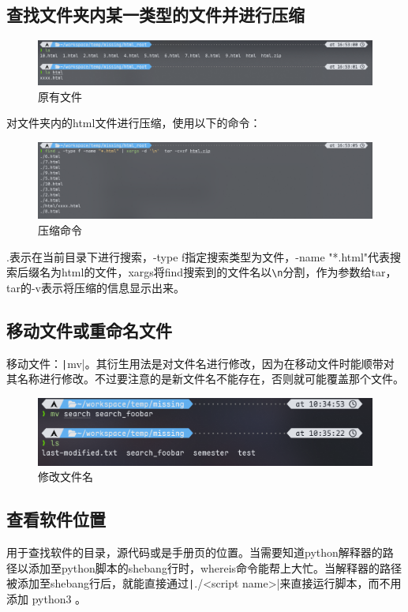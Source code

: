 \documentclass[fontset=ubuntu]{ctexart}
\begin{document}
\begin{sloppypar}
\subsection{查找文件夹内某一类型的文件并进行压缩}
\begin{figure}[htb]
    \centering
    \includegraphics[width=0.75\linewidth]{Html.png}
    \caption{原有文件}
    \label{fig:html}
\end{figure}
对文件夹内的html文件进行压缩，使用以下的命令：
\begin{figure}[htb]
    \centering
    \includegraphics[width=0.75\linewidth]{Tar.png}
    \caption{压缩命令}
    \label{fig:tar}
\end{figure}

.表示在当前目录下进行搜索，-type f指定搜索类型为文件，-name "*.html"代表搜索后缀名为html的文件，xargs将find搜索到的文件名以\verb|\n|分割，作为参数给tar，tar的-v表示将压缩的信息显示出来。

\subsection{移动文件或重命名文件}
移动文件：\texttt|mv|。其衍生用法是对文件名进行修改，因为在移动文件时能顺带对其名称进行修改。不过要注意的是新文件名不能存在，否则就可能覆盖那个文件。
\begin{figure}[htb]
    \centering
    \includegraphics[width=0.75\linewidth]{Mv.png}
    \caption{修改文件名}
    \label{fig:mv}
\end{figure}

\subsection{查看软件位置}
用于查找软件的目录，源代码或是手册页的位置。当需要知道python解释器的路径以添加至python脚本的shebang行时，whereis命令能帮上大忙。当解释器的路径被添加至shebang行后，就能直接通过\texttt|./<script name>|来直接运行脚本，而不用添加 python3 。


\end{sloppypar}
\end{document}
